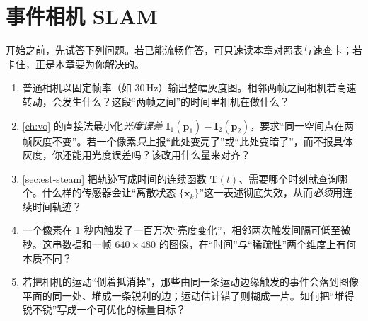 \chapter{事件相机 SLAM}
\label{ch:event}


\begin{practice}[前置自测]
开始之前，先试答下列问题。若已能流畅作答，可只速读本章对照表与速查卡；若卡住，正是本章要为你解决的。
\begin{enumerate}
  \item 普通相机以固定帧率（如 $30$\,Hz）输出整幅灰度图。相邻两帧之间相机若高速转动，会发生什么？这段“两帧之间”的时间里相机在做什么？
  \item \cref{ch:vo} 的直接法最小化\emph{光度误差} $\mathbf I_1(\mathbf p_1)-\mathbf I_2(\mathbf p_2)$，要求“同一空间点在两帧灰度不变”。若一个像素\emph{只}上报“此处变亮了”或“此处变暗了”，而不报具体灰度，你还能用光度误差吗？该改用什么量来对齐？
  \item \cref{sec:est-steam} 把轨迹写成时间的连续函数 $\mathbf T(t)$、需要哪个时刻就查询哪个。什么样的传感器会让“离散状态 $\{\mathbf x_k\}$”这一表述彻底失效，从而\emph{必须}用连续时间轨迹？
  \item 一个像素在 $1$ 秒内触发了一百万次“亮度变化”，相邻两次触发间隔可低至微秒。这串数据和一帧 $640\times480$ 的图像，在“时间”与“稀疏性”两个维度上有何本质不同？
  \item 若把相机的运动“倒着抵消掉”，那些由同一条运动边缘触发的事件会落到图像平面的同一处、堆成一条锐利的边；运动估计错了则糊成一片。如何把“堆得锐不锐”写成一个可优化的标量目标？
\end{enumerate}
\end{practice}

